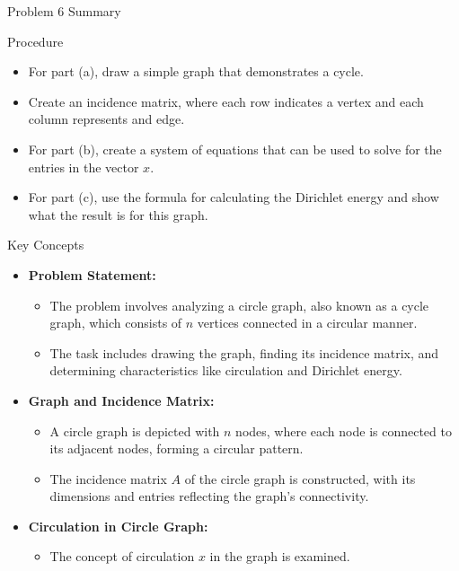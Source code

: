 \begin{summary}{Problem 6 Summary}
    \begin{statement}{Procedure}
        \begin{itemize}
            \item For part (a), draw a simple graph that demonstrates a cycle.
            \item Create an incidence matrix, where each row indicates a vertex and each column represents and edge.
            \item For part (b), create a system of equations that can be used to solve for the entries in the vector $x$.
            \item For part (c), use the formula for calculating the Dirichlet energy and show what the result is for this graph.
        \end{itemize}
    \end{statement}
    \begin{statement}{Key Concepts}
        \begin{itemize}
            \item \textbf{Problem Statement:}
            \begin{itemize}
                \item The problem involves analyzing a circle graph, also known as a cycle graph, which consists of \( n \) vertices connected in a circular manner.
                \item The task includes drawing the graph, finding its incidence matrix, and determining characteristics like circulation and Dirichlet energy.
            \end{itemize}
            \item \textbf{Graph and Incidence Matrix:}
            \begin{itemize}
                \item A circle graph is depicted with \( n \) nodes, where each node is connected to its adjacent nodes, forming a circular pattern.
                \item The incidence matrix \( A \) of the circle graph is constructed, with its dimensions and entries reflecting the graph's connectivity.
            \end{itemize}
            \item \textbf{Circulation in Circle Graph:}
            \begin{itemize}
                \item The concept of circulation \( x \) in the graph is examined.

\end{itemize}
\end{itemize}
\end{statement}
\end{summary}

